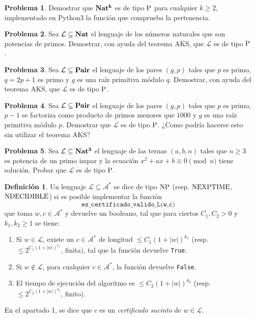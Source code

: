 \documentclass[a4paper, 11pt]{article}
\newcommand{\Alf}{\mathcal{A}}
\newcommand{\Lan}{\mathcal{L}}
\newcounter{numerodetema}
\theoremstyle{plain}
\theoremstyle{definition}
\newtheorem{defi}[teor]{Definición}
\newtheorem{prob}{Problema}[numerodetema]
\begin{document}
\bigskip

\begin{prob}
Demostrar que ${\bf Nat^k}$ es de tipo ${\rm P}$ para cualquier $k\geq 2$, implementado
en Python3 la función que comprueba la pertenencia.
\end{prob}

\begin{prob}
Sea $\Lan\subseteq{\bf Nat}$ el lenguaje de los números naturales que son potencias
de primos. Demostrar, con ayuda del teorema AKS, que $\Lan$ es de tipo ${\rm P}$.
\end{prob}

\begin{prob}
Sea $\Lan\subseteq{\bf Pair}$ el lenguaje de los pares $(g,p)$ tales que $p$ es
primo, $q=2p+1$ es primo y $g$ es una raíz primitiva módulo $q$. Demostrar, con ayuda
del teorema AKS, que $\Lan$ es de tipo ${\rm P}$.
\end{prob}

\begin{prob}
Sea $\Lan\subseteq{\bf Pair}$ el lenguaje de los pares $(g,p)$ tales que $p$ es
primo, $p-1$ se factoriza como producto de primos menores que $1000$ y $g$ es una
raíz primitiva módulo $p$. Demostrar que $\Lan$ es de tipo ${\rm P}$. ¿Como podría
hacerse esto sin utilizar el teorema AKS?
\end{prob}

\begin{prob}
Sea $\Lan\subseteq{\bf Nat^3}$ el lenguaje de las ternas $(a,b,n)$ tales que $n\geq 3$
es potencia de un primo impar y la ecuación $x^2+ax+b\equiv 0\pmod{n}$ tiene solución.
Probar que $\Lan$ es de tipo ${\rm P}$.
\end{prob}

\begin{defi}\label{defNP}
Un lenguaje $\Lan\subseteq\Alf^*$ se dice de tipo ${\rm NP}$ (resp. ${\rm NEXPTIME}$,
${\rm NDECIDIBLE}$) si es posible implementar la función
\[
   \texttt{es\_certificado\_valido\_L(w,c)}
\]
que toma $w,c\in\Alf^*$ y devuelve un booleano, tal que para ciertos $C_1,C_2>0$ y
$k_1,k_2\geq 1$ se tiene:
\begin{enumerate}
\item Si $w\in\Lan$, existe un $c\in\Alf^*$ de longitud $\leq C_1(1+|w|)^{k_1}$ (resp.
$\leq 2^{C_1(1+|w|)^{k_1}}$, finita), tal que la función devuelve \texttt{True}.
\item Si $w\not\in\Lan$, para cualquier $c\in\Alf^*$, la función devuelve \texttt{False}.
\item El tiempo de ejecución del algoritmo es $\leq C_2(1+|w|)^{k_2}$ (resp. $\leq
2^{C_2(1+|w|)^{k_2}}$, finito).
\end{enumerate}
En el apartado 1, se dice que $c$ es un \emph{certificado sucinto} de $w\in\Lan$.
\end{defi}
\end{document}
